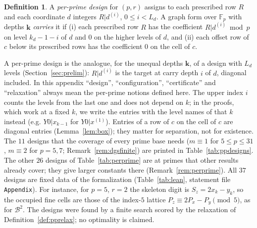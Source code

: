 \documentclass[11pt]{amsart}
\theoremstyle{definition}
\newtheorem{definition}[theorem]{Definition}
\theoremstyle{plain}
\newcommand{\F}{\mathbb{F}}
\begin{document}
\begin{definition}\label{def:ppdesign}
A \emph{per-prime design} for $(p,r)$ assigns to each prescribed row $R$ and each coordinate $d$ integers $R|d^{(i)}$, $0\le i<L_d$. A graph form over $\F_p$ with depths $\mathbf k$ \emph{carries} it if (i) each prescribed row $R$ has the coefficient $R|d^{(i)}\bmod p$ on level $k_d-1-i$ of $d$ and $0$ on the higher levels of $d$, and (ii) each offset row of $c$ below its prescribed rows has the coefficient $0$ on the cell of $c$.
\end{definition}

A per-prime design is the analogue, for the unequal depths $\mathbf k$, of a design with $L_d$ levels (Section~\ref{sec:prelim}): $R|d^{(i)}$ is the target at carry depth $i$ of $d$, diagonal included. In this appendix ``design'', ``configuration'', ``certificate'' and ``relaxation'' always mean the per-prime notions defined here. The upper index $i$ counts the levels from the last one and does not depend on $k$; in the proofs, which work at a fixed $k$, we write the entries with the level names of that $k$ instead (e.g. $Y0|x_{k-1}$ for $Y0|x^{(1)}$). Entries of a row of $c$ on the cell of $c$ are diagonal entries (Lemma~\ref{lem:box}); they matter for separation, not for existence. The $11$ designs that the coverage of every prime base needs ($m\equiv1$ for $5\le p\le31$, $m\equiv2$ for $p=5,7$; Remark~\ref{rem:dgsfinite}) are printed in Table~\ref{tab:ppdesigns}. The other $26$ designs of Table~\ref{tab:perprime} are at primes that other results already cover; they give larger constants there (Remark~\ref{rem:perprime}). All $37$ designs are fixed data of the formalization (Table~\ref{tab:lean}, statement file \texttt{Appendix}). For instance, for $p=5$, $r=2$ the skeleton digit is $S_z=2x_k-y_k$, so the occupied fine cells are those of the index-$5$ lattice $P_z\equiv2P_x-P_y\pmod5$, as for $\mathcal B^2$. The designs were found by a finite search scored by the relaxation of Definition~\ref{def:pprelax}; no optimality is claimed.
\end{document}
